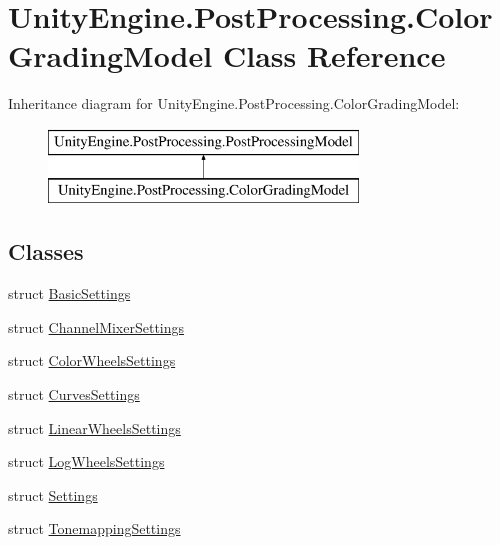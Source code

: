 \hypertarget{class_unity_engine_1_1_post_processing_1_1_color_grading_model}{}\section{Unity\+Engine.\+Post\+Processing.\+Color\+Grading\+Model Class Reference}
\label{class_unity_engine_1_1_post_processing_1_1_color_grading_model}
Inheritance diagram for Unity\+Engine.\+Post\+Processing.\+Color\+Grading\+Model\+:\begin{figure}[H]
\begin{center}
\leavevmode
\includegraphics[height=2.000000cm]{class_unity_engine_1_1_post_processing_1_1_color_grading_model}
\end{center}
\end{figure}
\subsection*{Classes}
\begin{DoxyCompactItemize}
\item 
struct \hyperlink{struct_unity_engine_1_1_post_processing_1_1_color_grading_model_1_1_basic_settings}{Basic\+Settings}
\item 
struct \hyperlink{struct_unity_engine_1_1_post_processing_1_1_color_grading_model_1_1_channel_mixer_settings}{Channel\+Mixer\+Settings}
\item 
struct \hyperlink{struct_unity_engine_1_1_post_processing_1_1_color_grading_model_1_1_color_wheels_settings}{Color\+Wheels\+Settings}
\item 
struct \hyperlink{struct_unity_engine_1_1_post_processing_1_1_color_grading_model_1_1_curves_settings}{Curves\+Settings}
\item 
struct \hyperlink{struct_unity_engine_1_1_post_processing_1_1_color_grading_model_1_1_linear_wheels_settings}{Linear\+Wheels\+Settings}
\item 
struct \hyperlink{struct_unity_engine_1_1_post_processing_1_1_color_grading_model_1_1_log_wheels_settings}{Log\+Wheels\+Settings}
\item 
struct \hyperlink{struct_unity_engine_1_1_post_processing_1_1_color_grading_model_1_1_settings}{Settings}
\item 
struct \hyperlink{struct_unity_engine_1_1_post_processing_1_1_color_grading_model_1_1_tonemapping_settings}{Tonemapping\+Settings}
\end{DoxyCompactItemize}
